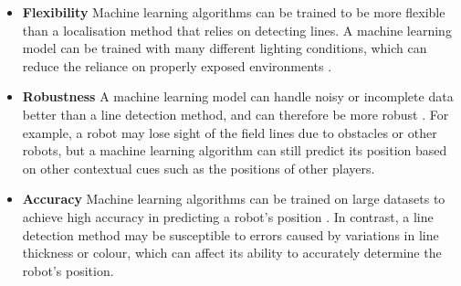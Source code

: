 \documentclass{uva-inf-bachelor-thesis}
\begin{document}
        \begin{itemize}
            \item \textbf{Flexibility} Machine learning algorithms can be trained to be more flexible than a localisation method that relies on detecting lines. A machine learning model can be trained with many different lighting conditions, which can reduce the reliance on properly exposed environments \cite{flex}.
            \item \textbf{Robustness} A machine learning model can handle noisy or incomplete data better than a line detection method, and can therefore be more robust \cite{robust}. For example, a robot may lose sight of the field lines due to obstacles or other robots, but a machine learning algorithm can still predict its position based on other contextual cues such as the positions of other players.
            \item \textbf{Accuracy} Machine learning algorithms can be trained on large datasets to achieve high accuracy in predicting a robot's position \cite{accuracy}. In contrast, a line detection method may be susceptible to errors caused by variations in line thickness or colour, which can affect its ability to accurately determine the robot's position.
        \end{itemize}

    
\end{document}
